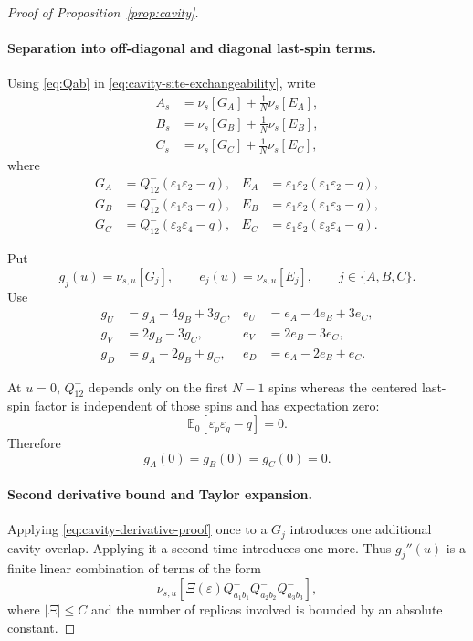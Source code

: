 \begin{proof}[Proof of Proposition~\ref{prop:cavity}]
\paragraph{Separation into off-diagonal and diagonal last-spin terms.}

Using \eqref{eq:Qab} in
\eqref{eq:cavity-site-exchangeability}, write
\begin{align}
 A_s&=\nu_s[G_A]+\frac1N\nu_s[E_A],
 \nonumber\\
 B_s&=\nu_s[G_B]+\frac1N\nu_s[E_B],
 \label{eq:cavity-decomposition-proof}\\
 C_s&=\nu_s[G_C]+\frac1N\nu_s[E_C],
 \nonumber
\end{align}
where
\begin{align*}
 G_A&=Q^-_{12}(\varepsilon_1\varepsilon_2-q),
 &
 E_A&=\varepsilon_1\varepsilon_2
      (\varepsilon_1\varepsilon_2-q),
 \\
 G_B&=Q^-_{12}(\varepsilon_1\varepsilon_3-q),
 &
 E_B&=\varepsilon_1\varepsilon_2
      (\varepsilon_1\varepsilon_3-q),
 \\
 G_C&=Q^-_{12}(\varepsilon_3\varepsilon_4-q),
 &
 E_C&=\varepsilon_1\varepsilon_2
      (\varepsilon_3\varepsilon_4-q).
\end{align*}

Put
\[
 g_j(u)=\nu_{s,u}[G_j],
 \qquad
 e_j(u)=\nu_{s,u}[E_j],
 \qquad j\in\{A,B,C\}.
\]
Use
\begin{align*}
 g_U&=g_A-4g_B+3g_C,
 &
 e_U&=e_A-4e_B+3e_C,
 \\
 g_V&=2g_B-3g_C,
 &
 e_V&=2e_B-3e_C,
 \\
 g_D&=g_A-2g_B+g_C,
 &
 e_D&=e_A-2e_B+e_C.
\end{align*}

At $u=0$, $Q^-_{12}$ depends only on the first $N-1$ spins whereas the
centered last-spin factor is independent of those spins and has expectation
zero:
\[
 \mathbb E_0[
 \varepsilon_p\varepsilon_q-q
 ]=0.
\]
Therefore
\begin{equation}
 g_A(0)=g_B(0)=g_C(0)=0.
 \label{eq:g-zero}
\end{equation}

\paragraph{Second derivative bound and Taylor expansion.}

Applying \eqref{eq:cavity-derivative-proof} once to a $G_j$ introduces
one additional cavity overlap.  Applying it a second time introduces one more.
Thus $g_j''(u)$ is a finite linear combination of terms of the form
\[
 \nu_{s,u}
 \left[
 \Xi(\varepsilon)
 Q^-_{a_1b_1}Q^-_{a_2b_2}Q^-_{a_3b_3}
 \right],
\]
where $|\Xi|\le C$ and the number of replicas involved is bounded by an
absolute constant.


\end{proof}
